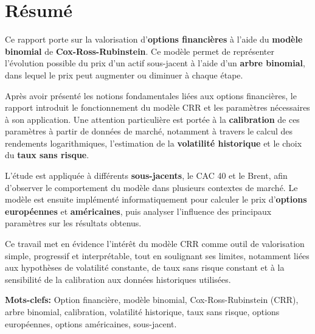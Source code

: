 \documentclass[11pt]{report}
\begin{document}




\chapter*{Résumé}

Ce rapport porte sur la valorisation d'\textbf{options financières} à l'aide du \textbf{modèle binomial} de \textbf{Cox-Ross-Rubinstein}. Ce modèle permet de représenter l'évolution possible du prix d'un actif sous-jacent à l'aide d'un \textbf{arbre binomial}, dans lequel le prix peut augmenter ou diminuer à chaque étape.

Après avoir présenté les notions fondamentales liées aux options financières, le rapport introduit le fonctionnement du modèle CRR et les paramètres nécessaires à son application. Une attention particulière est portée à la \textbf{calibration} de ces paramètres à partir de données de marché, notamment à travers le calcul des rendements logarithmiques, l'estimation de la \textbf{volatilité historique} et le choix du \textbf{taux sans risque}.

L'étude est appliquée à différents \textbf{sous-jacents}, le CAC 40 et le Brent, afin d'observer le comportement du modèle dans plusieurs contextes de marché. Le modèle est ensuite implémenté informatiquement pour calculer le prix d'\textbf{options européennes} et \textbf{américaines}, puis analyser l'influence des principaux paramètres sur les résultats obtenus.

Ce travail met en évidence l'intérêt du modèle CRR comme outil de valorisation simple, progressif et interprétable, tout en soulignant ses limites, notamment liées aux hypothèses de volatilité constante, de taux sans risque constant et à la sensibilité de la calibration aux données historiques utilisées.


\vspace{1em}

\textbf{Mots-clefs:} Option financière, modèle binomial, Cox-Ross-Rubinstein (CRR), arbre binomial, calibration, volatilité historique, taux sans risque, options européennes, options américaines, sous-jacent.
\end{document}
